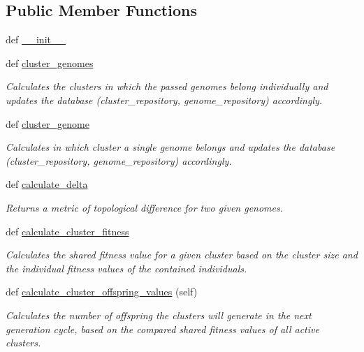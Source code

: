 \subsection*{Public Member Functions}
\begin{DoxyCompactItemize}
\item 
def \hyperlink{classNEAT__PyGenetics_1_1NEAT_1_1Analyst_1_1GenomeClusterer_1_1GenomeClusterer_a2f18f1f814c59bc18bc896c67331db10}{\+\_\+\+\_\+init\+\_\+\+\_\+}
\item 
def \hyperlink{classNEAT__PyGenetics_1_1NEAT_1_1Analyst_1_1GenomeClusterer_1_1GenomeClusterer_a3cb27bd4e57fbae51f5638bf252d7d19}{cluster\+\_\+genomes}
\begin{DoxyCompactList}\small\item\em Calculates the clusters in which the passed genomes belong individually and updates the database (cluster\+\_\+repository, genome\+\_\+repository) accordingly. \end{DoxyCompactList}\item 
def \hyperlink{classNEAT__PyGenetics_1_1NEAT_1_1Analyst_1_1GenomeClusterer_1_1GenomeClusterer_a4b17098e6b96981aa7a00ffe3c3510c8}{cluster\+\_\+genome}
\begin{DoxyCompactList}\small\item\em Calculates in which cluster a single genome belongs and updates the database (cluster\+\_\+repository, genome\+\_\+repository) accordingly. \end{DoxyCompactList}\item 
def \hyperlink{classNEAT__PyGenetics_1_1NEAT_1_1Analyst_1_1GenomeClusterer_1_1GenomeClusterer_a057cec399fba67f9f90c70ad9158ec5e}{calculate\+\_\+delta}
\begin{DoxyCompactList}\small\item\em Returns a metric of topological difference for two given genomes. \end{DoxyCompactList}\item 
def \hyperlink{classNEAT__PyGenetics_1_1NEAT_1_1Analyst_1_1GenomeClusterer_1_1GenomeClusterer_a5dba985534b3de86bb03574e683749f6}{calculate\+\_\+cluster\+\_\+fitness}
\begin{DoxyCompactList}\small\item\em Calculates the shared fitness value for a given cluster based on the cluster size and the individual fitness values of the contained individuals. \end{DoxyCompactList}\item 
def \hyperlink{classNEAT__PyGenetics_1_1NEAT_1_1Analyst_1_1GenomeClusterer_1_1GenomeClusterer_a6bd0107d083dade08414c19ad9aaadaf}{calculate\+\_\+cluster\+\_\+offspring\+\_\+values} (self)
\begin{DoxyCompactList}\small\item\em Calculates the number of offspring the clusters will generate in the next generation cycle, based on the compared shared fitness values of all active clusters. \end{DoxyCompactList}\end{DoxyCompactItemize}

